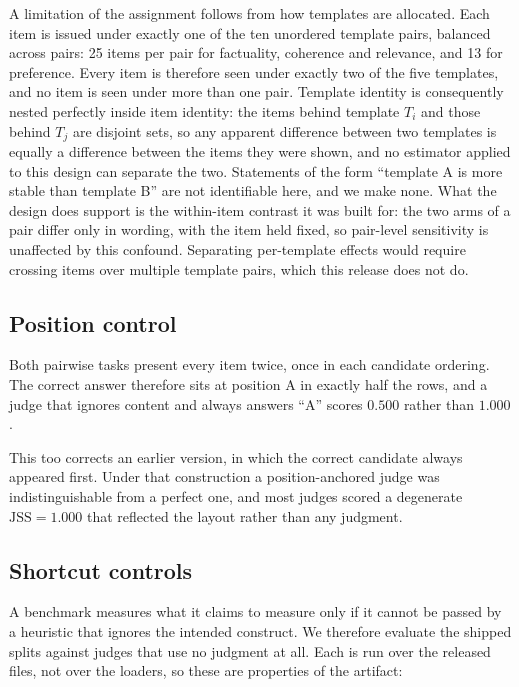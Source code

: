 \documentclass[11pt]{article}          %
\begin{document}
A limitation of the assignment follows from how templates are allocated. Each
item is issued under exactly one of the ten unordered template pairs, balanced
across pairs: 25 items per pair for factuality, coherence and relevance, and 13
for preference. Every item is therefore seen under exactly two of the five
templates, and no item is seen under more than one pair. Template identity is
consequently nested perfectly inside item identity: the items behind template
$T_i$ and those behind $T_j$ are disjoint sets, so any apparent difference
between two templates is equally a difference between the items they were shown,
and no estimator applied to this design can separate the two. Statements of the
form ``template A is more stable than template B'' are not identifiable here,
and we make none. What the design does support is the within-item contrast it
was built for: the two arms of a pair differ only in wording, with the item held
fixed, so pair-level sensitivity is unaffected by this confound. Separating
per-template effects would require crossing items over multiple template pairs,
which this release does not do.

\subsection{Position control}

Both pairwise tasks present every item twice, once in each candidate ordering.
The correct answer therefore sits at position A in exactly half the rows, and a
judge that ignores content and always answers ``A'' scores $0.500$ rather than
$1.000$.

This too corrects an earlier version, in which the correct candidate always
appeared first. Under that construction a position-anchored judge was
indistinguishable from a perfect one, and most judges scored a degenerate
$\mathrm{JSS}=1.000$ that reflected the layout rather than any judgment.

\subsection{Shortcut controls}
\label{sec:shortcuts}

A benchmark measures what it claims to measure only if it cannot be passed by a
heuristic that ignores the intended construct. We therefore evaluate the shipped
splits against judges that use no judgment at all. Each is run over the released
files, not over the loaders, so these are properties of the artifact:
\end{document}
